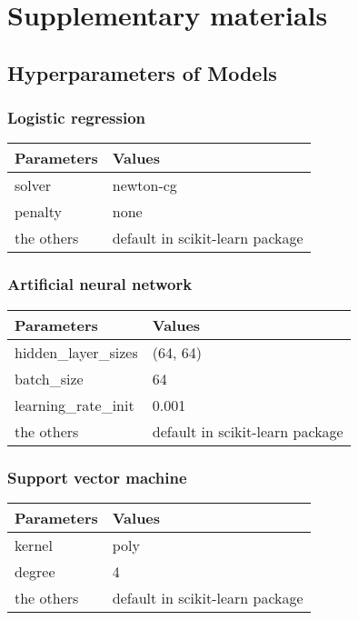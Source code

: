 \documentclass[review]{elsarticle}
\begin{document}
\section{Supplementary materials}
\subsection{Hyperparameters of Models}
\subsubsection{Logistic regression}

\begin{table}[H]
    \begin{tabular}{|m{9em}|m{14em}|}
    \hline
    \textbf{Parameters} & \textbf{Values} \\ \hline
    solver & newton-cg \\ \hline
    penalty & none \\ \hline
    the others & default in scikit-learn package \\ \hline
    \end{tabular}
\end{table}

\subsubsection{Artificial neural network}

\begin{table}[H]
    \begin{tabular}{|m{9em}|m{14em}|}
    \hline
    \textbf{Parameters} & \textbf{Values} \\ \hline
    hidden\_layer\_sizes & (64, 64) \\ \hline
    batch\_size & 64 \\ \hline
    learning\_rate\_init & 0.001 \\ \hline
    the others & default in scikit-learn package \\ \hline
    \end{tabular}
\end{table}

\subsubsection{Support vector machine}

\begin{table}[H]
    \begin{tabular}{|m{9em}|m{14em}|}
    \hline
    \textbf{Parameters} & \textbf{Values} \\ \hline
    kernel & poly \\ \hline
    degree & 4 \\ \hline
    the others & default in scikit-learn package \\ \hline
    \end{tabular}
\end{table}
\end{document}
